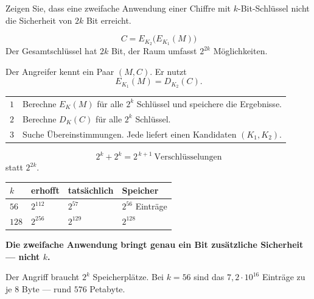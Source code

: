 \begin{aufgabe}
Zeigen Sie, dass eine zweifache Anwendung einer Chiffre mit $k$-Bit-Schlüssel nicht die Sicherheit von $2k$ Bit erreicht.

\loesung
{}
\[ C = E_{K_2}\bigl(E_{K_1}(M)\bigr) \]
Der Gesamtschlüssel hat $2k$ Bit, der Raum umfasst $2^{2k}$ Möglichkeiten.

Der Angreifer kennt ein Paar $(M,C)$. Er nutzt
\[ E_{K_1}(M) = D_{K_2}(C) . \]

\begin{center}
{\small
\renewcommand{\arraystretch}{1.5}
\begin{tabular}{@{}P{1.0cm}P{7.4cm}@{}}
\toprule
$1$ & Berechne $E_{K}(M)$ für alle $2^{k}$ Schlüssel und speichere die Ergebnisse.\\
$2$ & Berechne $D_{K}(C)$ für alle $2^{k}$ Schlüssel.\\
$3$ & Suche Übereinstimmungen. Jede liefert einen Kandidaten $(K_1,K_2)$.\\
\bottomrule
\end{tabular}}
\end{center}

\[ 2^{k} + 2^{k} = 2^{\,k+1} \ \text{Verschlüsselungen} \]
statt $2^{2k}$.

\begin{center}
{\small
\renewcommand{\arraystretch}{1.48}
\begin{tabular}{@{}P{1.6cm}P{2.0cm}P{2.2cm}P{2.0cm}@{}}
\toprule
$k$ & \textbf{erhofft} & \textbf{tatsächlich} & \textbf{Speicher}\\
\midrule
$56$ & $2^{112}$ & $2^{57}$ & $2^{56}$ Einträge\\
$128$ & $2^{256}$ & $2^{129}$ & $2^{128}$\\
\bottomrule
\end{tabular}}
\end{center}

\begin{center}
\begin{minipage}{0.9\textwidth}
\textbf{Die zweifache Anwendung bringt genau ein Bit zusätzliche Sicherheit --- nicht $k$.}
\end{minipage}
\end{center}

Der Angriff braucht $2^{k}$ Speicherplätze. Bei $k=56$ sind das $7{,}2\cdot10^{16}$ Einträge zu je $8$ Byte --- rund $576$ Petabyte.


\end{aufgabe}
